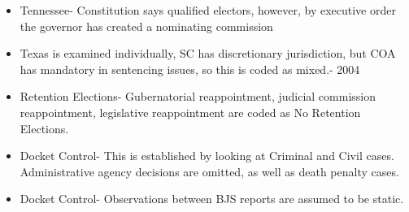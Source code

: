 \documentclass[12pt]{article}
\begin{document}
\begin{itemize}
	\item Tennessee- Constitution says qualified electors, however, by executive order the governor has created a nominating commission
	
	\item Texas is examined individually, SC has discretionary jurisdiction, but COA has mandatory in sentencing issues, so this is coded as mixed.- 2004
	
	\item Retention Elections- Gubernatorial reappointment, judicial commission reappointment, legislative reappointment are coded as No Retention Elections.
	
	\item Docket Control- This is established by looking at Criminal and Civil cases.  Administrative agency decisions are omitted, as well as death penalty cases.
	
	\item Docket Control- Observations between BJS reports are assumed to be static.
\end{itemize}
\end{document}
